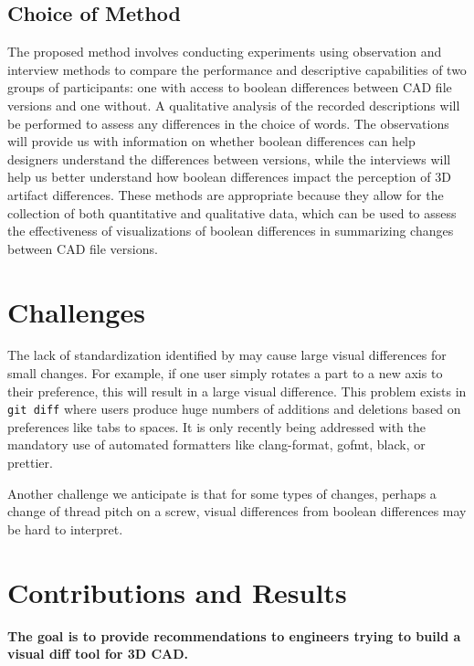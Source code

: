 \documentclass[sigconf,authorversion,nonacm]{acmart}
\begin{document}
\subsection{Choice of Method}
The proposed method involves conducting experiments using observation and interview methods to compare the performance and descriptive capabilities of two groups of participants: one with access to boolean differences between CAD file versions and one without. A qualitative analysis of the recorded descriptions will be performed to assess any differences in the choice of words. The observations will provide us with information on whether boolean differences can help designers understand the differences between versions, while the interviews will help us better understand how boolean differences impact the perception of 3D artifact differences. These methods are appropriate because they allow for the collection of both quantitative and qualitative data, which can be used to assess the effectiveness of visualizations of boolean differences in summarizing changes between CAD file versions.
\section{Challenges}

The lack of standardization identified by \citet{cheng2023age} may cause large visual differences for small changes.
For example, if one user simply rotates a part to a new axis to their preference, this will result in a large visual difference.
This problem exists in \texttt{git diff} where users produce huge numbers of additions and deletions based on preferences like tabs to spaces.
It is only recently being addressed with the mandatory use of automated formatters like clang-format, gofmt, black, or prettier.

Another challenge we anticipate is that for some types of changes, perhaps a change of thread pitch on a screw, visual differences from boolean differences may be hard to interpret.

\section{Contributions and Results}

\textbf{The goal is to provide recommendations to engineers trying to build a visual diff tool for 3D CAD.}
\end{document}

